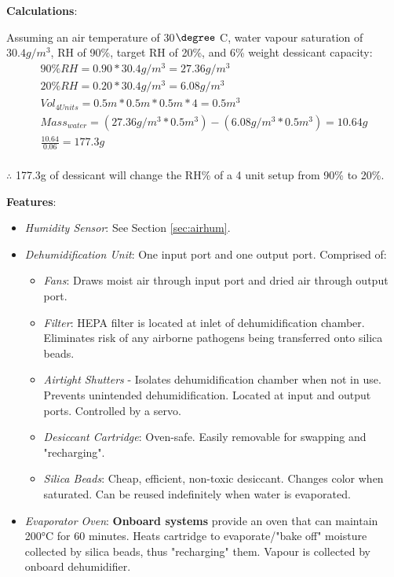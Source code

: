 \documentclass{report}
\begin{document}
\textbf{Calculations}:

Assuming an air temperature of 30$\degree$ C, water vapour saturation of $30.4g/m^{3}$, RH of 90\%, target RH of 20\%, and 6\% weight dessicant capacity:
\vspace{.05cm}
\begin{gather*}
    90\% RH = 0.90 * 30.4g/m^{3} = 27.36g/m^{3} \\
    20\% RH = 0.20 * 30.4g/m^{3} = 6.08g/m^{3} \\
    Vol_{4 Units} = 0.5m * 0.5m * 0.5m * 4 = 0.5m^{3} \\
    Mass_{water} = (27.36g/m^{3} * 0.5m^{3}) - (6.08g/m^{3} * 0.5m^{3}) = 10.64g \\
    \frac{10.64}{0.06} = 177.3g \\
\end{gather*}

$\therefore$ 177.3g of dessicant will change the RH\% of a 4 unit setup from 90\% to 20\%.


\textbf{Features}:
\begin{itemize}
    \item \textit{Humidity Sensor}: See Section \ref{sec:airhum}.
    \item \textit{Dehumidification Unit}: One input port and one output port. Comprised of:
    \begin{itemize}
        \item \textit{Fans}: Draws moist air through input port and dried air through output port.
        \item \textit{Filter}: HEPA filter is located at inlet of dehumidification chamber. Eliminates risk of any airborne pathogens being transferred onto silica beads.
        \item \textit{Airtight Shutters} - Isolates dehumidification chamber when not in use. Prevents unintended dehumidification. Located at input and output ports. Controlled by a servo.
        \item \textit{Desiccant Cartridge}: Oven-safe. Easily removable for swapping and "recharging".
        \item \textit{Silica Beads}: Cheap, efficient, non-toxic desiccant. Changes color when saturated. Can be reused indefinitely when water is evaporated.
    \end{itemize}
    \item \textit{Evaporator Oven}: \textbf{Onboard systems} provide an oven that can maintain 200°C for 60 minutes. Heats cartridge to evaporate/"bake off" moisture collected by silica beads, thus "recharging" them. Vapour is collected by onboard dehumidifier.
\end{itemize}
\end{document}
